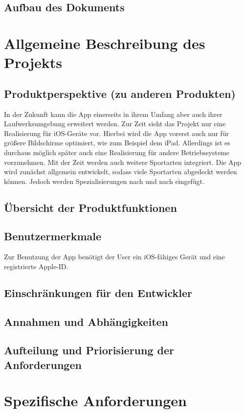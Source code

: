 \section{Aufbau des Dokuments}

\chapter{Allgemeine Beschreibung des Projekts}
\section{Produktperspektive (zu anderen Produkten)}
In der Zukunft kann die App einerseits in ihrem Umfang aber auch ihrer Laufwerksumgebung erweitert werden.
Zur Zeit sieht das Projekt nur eine Realisierung für iOS-Geräte vor. Hierbei wird die App vorerst auch nur für größere Bildschirme optimiert, wie zum Beispiel dem iPad. Allerdings ist es durchaus möglich später auch eine Realisierung für andere Betriebssysteme vorzunehmen.
Mit der Zeit werden auch weitere Sportarten integriert. Die App wird zunächst allgemein entwickelt, sodass viele Sportarten abgedeckt werden können. Jedoch werden Spezialisierungen nach und nach eingefügt.
 
\section{Übersicht der Produktfunktionen}
\section{Benutzermerkmale}
Zur Benutzung der App benötigt der User ein iOS-fähiges Gerät und eine registrierte Apple-ID.

\section{Einschränkungen für den Entwickler}
\section{Annahmen und Abhängigkeiten}
\section{Aufteilung und Priorisierung der Anforderungen}

\chapter{Spezifische Anforderungen}
